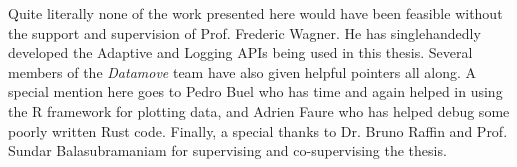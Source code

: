 \documentclass[11pt, a4paper, oneside]{Thesis} %
\begin{document}
\begin{acknowledgements}
    Quite literally none of the work presented here would have been feasible without the support and supervision of Prof. Frederic Wagner. He has singlehandedly developed the Adaptive and Logging APIs being used in this thesis. Several members of the \emph{Datamove} team have also given helpful pointers all along. A special mention here goes to Pedro Buel who has time and again helped in using the R framework for plotting data, and Adrien Faure who has helped debug some poorly written Rust code. Finally, a special thanks to Dr. Bruno Raffin and Prof. Sundar Balasubramaniam for supervising and co-supervising the thesis.
\end{acknowledgements}


\pagestyle{fancy}

\tableofcontents %

%


%
%

\end{document}

